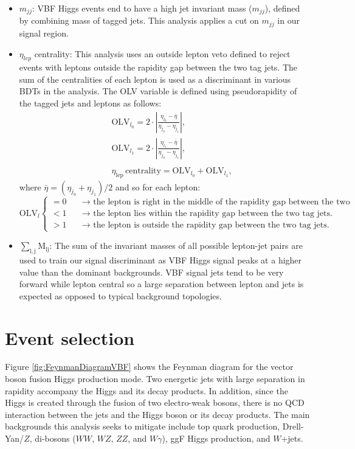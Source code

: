 \begin{itemize}
\item $m_{jj}$:
VBF Higgs events end to have a high jet invariant mass ($m_{jj}$), defined by combining mass of tagged jets. This analysis applies a cut on $m_{jj}$ in our signal region. 
\item $\eta_{lep}$ centrality: This analysis uses an outside lepton veto defined to reject events with leptons outside the rapidity gap between the two tag jets. The sum of the centralities of each lepton is used as a discriminant in various BDTs in the analysis. The OLV variable is defined using pseudorapidity of the tagged jets and leptons as follows:
\begin{eqnarray}
&& \textrm{OLV}_{l_0} = 2 \cdot |\frac{\eta_{l_0}-\bar{\eta}}{\eta_{j_0}-\eta_{j_1}}|,  \nonumber\\
&& \textrm{OLV}_{l_1} = 2 \cdot |\frac{\eta_{l_1}-\bar{\eta}}{\eta_{j_0}-\eta_{j_1}}|,  \nonumber\\
&&\nonumber \\
&& \eta_{\mathrm{lep}} \, \textrm{centrality} = \textrm{OLV}_{l_0} + \textrm{OLV}_{l_1},
\label{eqn:contOLV_def}
\end{eqnarray}
where $\bar{\eta} = (\eta_{j_0} + \eta_{j_1})/2$ and so for each lepton: 
 \begin{equation}
   \textrm{OLV}_l \left\{
   \begin{array} {ll}
     = 0 & \quad \rightarrow \textrm{  the lepton is right in the middle of the rapidity gap between the two tag jets.} \\
     < 1 & \quad \rightarrow \textrm{  the lepton lies within the rapidity gap between the two tag jets.} \\
     >1  & \quad \rightarrow \textrm{   the lepton is outside the rapidity gap between the two tag jets.} 
    \end{array} \right. 
 \end{equation}
\item $\mathrm{\sum_{l,j} M_{lj}}$: The sum of the invariant masses of all possible lepton-jet pairs are used to train our signal discriminant as VBF Higgs signal peaks at a higher value than the dominant backgrounds. VBF signal jets tend to be very forward while lepton central so a large separation between lepton and jets is expected as opposed to typical background topologies. 
\end{itemize}


\section{Event selection}
Figure \ref{fig:FeynmanDiagramVBF} shows the Feynman diagram for the vector boson fusion Higgs production mode. Two energetic jets with large separation in rapidity accompany the Higgs and its decay products. In addition, since the Higgs is created through the fusion of two electro-weak bosons, there is no QCD interaction between the jets and the Higgs boson or its decay products. The main backgrounds this analysis seeks to mitigate include top quark production, Drell-Yan/$Z$, di-bosons ($WW$, $WZ$, $ZZ$, and $W\gamma$), ggF Higgs production, and $W$+jets. 

